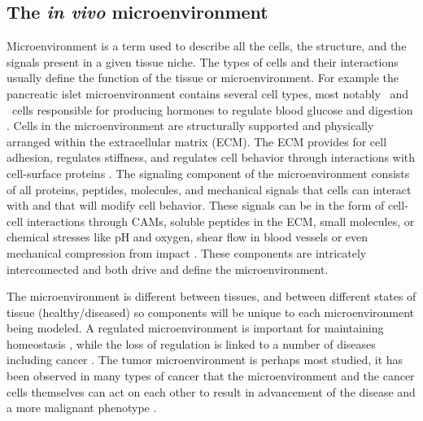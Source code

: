 \subsection{The \textit{in vivo} microenvironment}
Microenvironment is a term used to describe all the cells, the structure, and the signals present in a given tissue niche. The types of cells and their interactions usually define the function of the tissue or microenvironment. For example the pancreatic islet microenvironment contains several cell types, most notably \textalpha \ and \textbeta \ cells responsible for producing hormones to regulate blood glucose and digestion \cite{Cabrera2006TheFunction.}. Cells in the microenvironment are structurally supported and physically arranged within the extracellular matrix (ECM). The ECM provides for cell adhesion, regulates stiffness, and regulates cell behavior through interactions with cell-surface proteins \cite{Stamenkovic2003, Meredith1993TheFactor.}. The signaling component of the microenvironment consists of all proteins, peptides, molecules, and mechanical signals that cells can interact with and that will modify cell behavior. These signals can be in the form of cell-cell interactions through CAMs, soluble peptides in the ECM, small molecules, or chemical stresses like pH and oxygen, shear flow in blood vessels or even mechanical compression from impact \cite{Kim2011b}. These components are intricately interconnected and both drive and define the microenvironment.

The microenvironment is different between tissues, and between different states of tissue (healthy/diseased) so components will be unique to each microenvironment being modeled. A regulated microenvironment is important for maintaining homeostasis \cite{Nie2013}, while the loss of regulation is linked to a number of diseases including cancer \cite{Malizia1985TheLymphocytes., Yip2011, medema2011microenvironmental, Charbord1996EarlyMicroenvironment., Martin1995, Nie2013}. The tumor microenvironment is perhaps most studied, it has been observed in many types of cancer that the microenvironment and the cancer cells themselves can act on each other to result in advancement of the disease and a more malignant phenotype \cite{Meads2008, Jun2006, Shain2001, Seo2015}.

